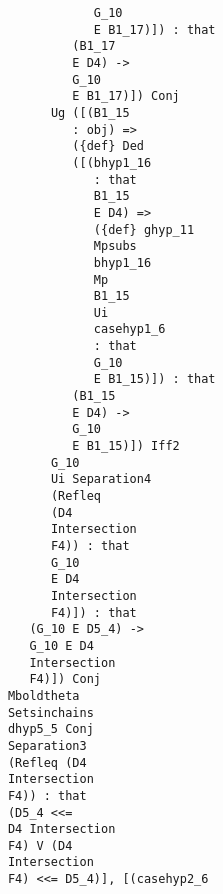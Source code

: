 \documentclass[12pt]{article}
\begin{document}
\begin{verbatim}
                                           G_10 
                                           E B1_17)]) : that 
                                        (B1_17 
                                        E D4) -> 
                                        G_10 
                                        E B1_17)]) Conj 
                                     Ug ([(B1_15 
                                        : obj) => 
                                        ({def} Ded 
                                        ([(bhyp1_16 
                                           : that 
                                           B1_15 
                                           E D4) => 
                                           ({def} ghyp_11 
                                           Mpsubs 
                                           bhyp1_16 
                                           Mp 
                                           B1_15 
                                           Ui 
                                           casehyp1_6 
                                           : that 
                                           G_10 
                                           E B1_15)]) : that 
                                        (B1_15 
                                        E D4) -> 
                                        G_10 
                                        E B1_15)]) Iff2 
                                     G_10 
                                     Ui Separation4 
                                     (Refleq 
                                     (D4 
                                     Intersection 
                                     F4)) : that 
                                     G_10 
                                     E D4 
                                     Intersection 
                                     F4)]) : that 
                                  (G_10 E D5_4) -> 
                                  G_10 E D4 
                                  Intersection 
                                  F4)]) Conj 
                               Mboldtheta 
                               Setsinchains 
                               dhyp5_5 Conj 
                               Separation3 
                               (Refleq (D4 
                               Intersection 
                               F4)) : that 
                               (D5_4 <<= 
                               D4 Intersection 
                               F4) V (D4 
                               Intersection 
                               F4) <<= D5_4)], [(casehyp2_6 

\end{verbatim}
\end{document}

